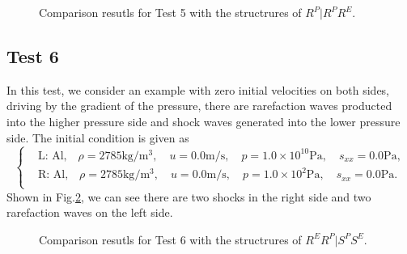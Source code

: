 \documentclass{article}
\numberwithin{equation}{section}
\numberwithin{table}{section}
\begin{document}
\begin{figure}
  \centering


    \caption{Comparison resutls for Test 5 with the structrures of $R^P|R^PR^E$.  }
  \label{fig:case5}
\end{figure}
\subsection{Test 6}
In this test, we consider an example with zero initial velocities on both sides, driving by the gradient of the pressure, there are rarefaction waves producted into the higher pressure side and shock waves generated into the lower pressure side. The initial condition is given as
\begin{equation}
 \left\{ \begin{aligned}
	 &	 \text{L: Al,}\quad  \rho = 2785 \text{kg}/\text{m}^3, \quad  u = 0.0\text{m}/\text{s}, \quad  p = 1.0\times 10^{10} \text{Pa}, \quad s_{xx}= 0.0 \text{Pa},\\
	 &	 \text{R: Al,}\quad  \rho = 2785 \text{kg}/\text{m}^3, \quad  u = 0.0\text{m}/\text{s}, \quad  p = 1.0 \times 10^2 \text{Pa}, \quad  s_{xx}=0.0\text{Pa}.\\
   \end{aligned}
 \right.
\end{equation}
Shown in Fig.\ref{fig:case9}, we can see there are two shocks in the right side and two rarefaction waves on the left side.
\begin{figure}
  \centering


    \caption{Comparison resutls for Test 6 with the structrures of $R^ER^P|S^PS^E$.  }
  \label{fig:case9}
\end{figure}
\end{document}
